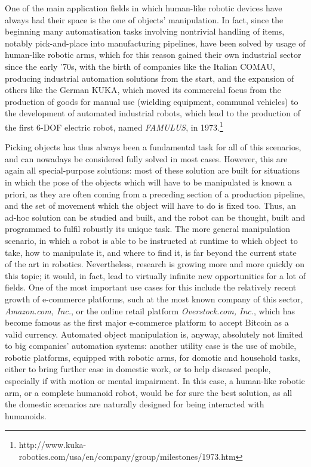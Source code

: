 One of the main application fields in which human-like robotic devices
have always had their space is the one of objects' manipulation. In
fact, since the beginning many automatisation tasks involving
nontrivial handling of items, notably pick-and-place into
manufacturing pipelines, have been solved by usage of human-like
robotic arms, which for this reason gained their own industrial sector
since the early '70s, with the birth of companies like the Italian COMAU,
producing industrial automation solutions from the start, and the
expansion of others like the German KUKA, which moved its commercial
focus from the production of goods for manual use (wielding equipment,
communal vehicles) to the development of automated industrial robots,
which lead to the production of the first 6-DOF electric robot, named
\emph{FAMULUS}, in 1973.\footnote{http://www.kuka-robotics.com/usa/en/company/group/milestones/1973.htm}

Picking objects has thus always been a fundamental task for all of this
scenarios, and can nowadays be considered fully solved in most
cases. However, this are again all special-purpose solutions: most of
these solution are built for situations in which the pose of the
objects which will have to be manipulated is known a priori, as they
are often coming from a preceding section of a production pipeline,
and the set of movement which the object will have to do is fixed
too. Thus, an ad-hoc solution can be studied and built, and the robot
can be thought, built and programmed to fulfil robustly its unique
task. The more general manipulation scenario, in which a robot is able
to be instructed at runtime to which object to take, how to manipulate
it, and where to find it, is far beyond the current state of the art
in robotics. Nevertheless, research is growing more and more
quickly on this topic; it would, in fact, lead to virtually infinite
new opportunities for a lot of fields. One of the most important use
cases for this include
the relatively recent growth of e-commerce platforms, such at the 
most known company of this sector, \emph{Amazon.com, Inc.}, or the
online retail platform \emph{Overstock.com, Inc.}, which has become
famous as the first major e-commerce platform to accept Bitcoin as a
valid currency. Automated object manipulation is, anyway, absolutely
not limited to big companies' automation systems: another utility case
is the use of mobile, robotic platforms, equipped with robotic arms,
for domotic and household tasks, either to bring further ease in
domestic work, or to help diseased people, especially if with motion
or mental impairment. In this case, a human-like robotic arm, or a
complete humanoid robot, would be for sure the best solution, as all
the domestic scenarios are naturally designed for being interacted
with humanoids.

